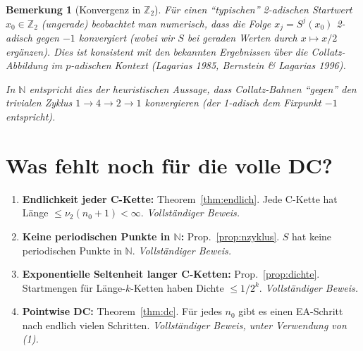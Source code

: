 \documentclass[12pt,a4paper]{article}
\newtheorem{bemerkung}[definition]{Bemerkung}
\newcommand{\vii}{\nu_2}
\newcommand{\N}{\mathbb{N}}
\newcommand{\Ztwo}{\mathbb{Z}_2}     %
\begin{document}
\begin{bemerkung}[Konvergenz in $\Ztwo$]
Für einen ``typischen'' 2-adischen Startwert $x_0 \in \Ztwo$ (ungerade)
beobachtet man numerisch, dass die Folge $x_j = S^j(x_0)$ 2-adisch
gegen $-1$ konvergiert (wobei wir $S$ bei geraden Werten durch
$x \mapsto x/2$ ergänzen). Dies ist konsistent mit den bekannten
Ergebnissen über die Collatz-Abbildung im $p$-adischen Kontext
(Lagarias 1985, Bernstein \& Lagarias 1996).

In $\N$ entspricht dies der heuristischen Aussage, dass Collatz-Bahnen
``gegen'' den trivialen Zyklus $1 \to 4 \to 2 \to 1$ konvergieren
(der 1-adisch dem Fixpunkt $-1$ entspricht).
\end{bemerkung}

\section{Was fehlt noch für die volle DC?}

\begin{tcolorbox}[kernidee, title={Zusammenfassung: Was ist bewiesen}]
\begin{enumerate}[label=(\arabic*)]
  \item \textbf{Endlichkeit jeder C-Kette:} Theorem~\ref{thm:endlich}.
    Jede C-Kette hat Länge $\leq \vii(n_0+1) < \infty$.
    \emph{Vollständiger Beweis.}

  \item \textbf{Keine periodischen Punkte in $\N$:}
    Prop.~\ref{prop:nzyklus}. $S$ hat keine periodischen Punkte in $\N$.
    \emph{Vollständiger Beweis.}

  \item \textbf{Exponentielle Seltenheit langer C-Ketten:}
    Prop.~\ref{prop:dichte}. Startmengen für Länge-$k$-Ketten haben
    Dichte $\leq 1/2^k$.
    \emph{Vollständiger Beweis.}

  \item \textbf{Pointwise DC:} Theorem~\ref{thm:dc}. Für jedes $n_0$
    gibt es einen EA-Schritt nach endlich vielen Schritten.
    \emph{Vollständiger Beweis, unter Verwendung von (1).}
\end{enumerate}
\end{tcolorbox}
\end{document}

